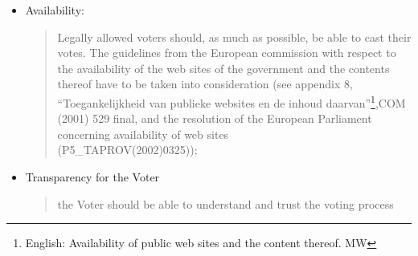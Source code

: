 \begin{itemize}
\item Availability:
\begin{quote}
Legally allowed voters should, as much as possible, be able to cast
their votes. The guidelines from the European commission with
respect to the availability of the web sites of the government and the
contents thereof have to be taken into consideration (see appendix 8,
``Toegankelijkheid van publieke websites en de inhoud
daarvan''\footnote{English: Availability of public web sites and the
content thereof. MW},COM (2001) 529 final, and the resolution of the
European Parliament concerning availability of web sites\\
(P5\_TAPROV(2002)0325));
\end{quote}

\item Transparency for the Voter
\begin{quote}
the Voter should be able to understand and trust the voting process
\end{quote}

\end{itemize}





